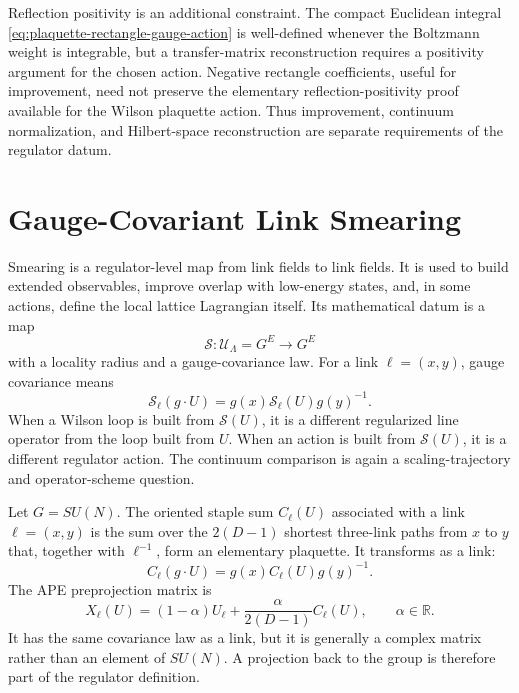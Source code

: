Reflection positivity is an additional constraint.  The compact Euclidean
integral \eqref{eq:plaquette-rectangle-gauge-action} is well-defined whenever
the Boltzmann weight is integrable, but a transfer-matrix reconstruction
requires a positivity argument for the chosen action.  Negative rectangle
coefficients, useful for improvement, need not preserve the elementary
reflection-positivity proof available for the Wilson plaquette action.
Thus improvement, continuum normalization, and Hilbert-space reconstruction
are separate requirements of the regulator datum.

\section{Gauge-Covariant Link Smearing}
\label{sec:gauge-covariant-link-smearing}

Smearing is a regulator-level map from link fields to link fields.  It is
used to build extended observables, improve overlap with low-energy states,
and, in some actions, define the local lattice Lagrangian itself.  Its
mathematical datum is a map
\[
  \mathcal S:\mathcal U_\Lambda=G^E\to G^E
\]
with a locality radius and a gauge-covariance law.  For a link
\(\ell=(x,y)\), gauge covariance means
\begin{equation}
  \mathcal S_\ell(g\cdot U)
  =
  g(x)\mathcal S_\ell(U)g(y)^{-1}.
  \label{eq:smearing-gauge-covariance}
\end{equation}
When a Wilson loop is built from \(\mathcal S(U)\), it is a different
regularized line operator from the loop built from \(U\).  When an action is
built from \(\mathcal S(U)\), it is a different regulator action.  The
continuum comparison is again a scaling-trajectory and operator-scheme
question.

Let \(G=SU(N)\).  The oriented staple sum \(C_\ell(U)\) associated with a
link \(\ell=(x,y)\) is the sum over the \(2(D-1)\) shortest three-link paths
from \(x\) to \(y\) that, together with \(\ell^{-1}\), form an elementary
plaquette.  It transforms as a link:
\begin{equation}
  C_\ell(g\cdot U)=g(x)C_\ell(U)g(y)^{-1}.
  \label{eq:staple-link-covariance}
\end{equation}
The APE preprojection matrix is
\begin{equation}
  X_\ell(U)
  =
  (1-\alpha)U_\ell
  +
  \frac{\alpha}{2(D-1)}C_\ell(U),
  \qquad \alpha\in\mathbb R .
  \label{eq:ape-preprojection}
\end{equation}
It has the same covariance law as a link, but it is generally a complex
matrix rather than an element of \(SU(N)\).  A projection back to the group
is therefore part of the regulator definition.

